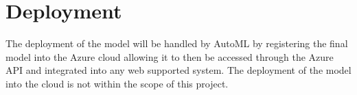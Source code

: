 \section{Deployment}

The deployment of the model will be handled by AutoML by registering the final model into the Azure cloud allowing it to then be accessed through the Azure API and integrated into any web supported system. The deployment of the model into the cloud is not within the scope of this project.



